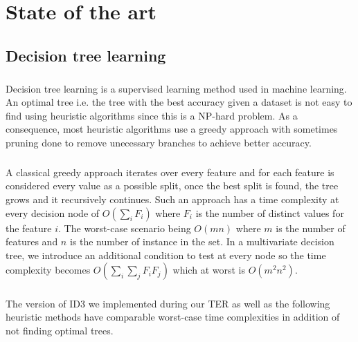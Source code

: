 \documentclass[12pt]{report}
\theoremstyle{definition}
\theoremstyle{definition}
\theoremstyle{definition}
\begin{document}
\chapter{State of the art}
\section{Decision tree learning} 
\paragraph{} Decision tree learning is a supervised learning method used in machine learning. An optimal tree i.e.
the tree with the best accuracy given a dataset is not easy to find using heuristic algorithms since this is
a NP-hard problem. As a consequence, most heuristic algorithms use a greedy approach with sometimes pruning
done to remove unecessary branches to achieve better accuracy.
\paragraph{} A classical greedy approach iterates over every feature and for each feature is considered every
value as a possible split, once the best split is found, the tree grows and it recursively continues.
Such an approach has a time complexity at every decision node of $O(\sum_{i}^{}F_i)$ where $F_i$ is the number
of distinct values for the feature $i$. The worst-case scenario being $O(mn)$ where $m$ is the number of
features and $n$ is the number of instance in the set. In a multivariate decision tree, we introduce an
additional condition to test at every node so the time complexity becomes $O(\sum_{i}\sum_{j}F_iF_j)$ which at
worst is $O(m^2n^2)$.
\paragraph{} The version of ID3 we implemented during our TER as well as the following heuristic methods have
comparable worst-case time complexities in addition of not finding optimal trees.

\newpage
\end{document}
